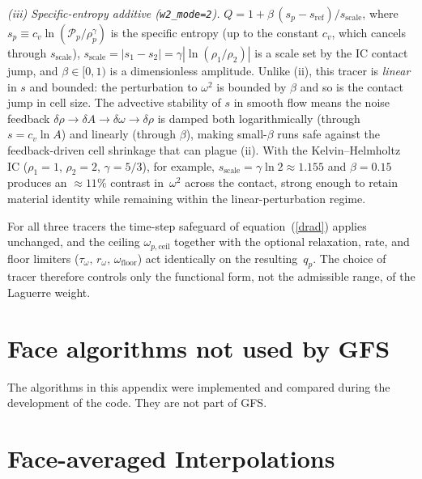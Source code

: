 \documentclass[twocolumn]{aastex63}
\newcommand{\pressure}[0]{\mathcal{P}}
\begin{document}
\textit{(iii) Specific-entropy additive (\texttt{w2\_mode=2}).}
$Q = 1 + \beta\,(s_p - s_\textrm{ref})/s_\textrm{scale}$, where
$s_p\equiv c_v\ln(\pressure_p/\rho_p^{\gamma})$ is the specific entropy
(up to the constant $c_v$, which cancels through
$s_\textrm{scale}$),
$s_\textrm{scale}=|s_1-s_2|=\gamma|\ln(\rho_1/\rho_2)|$ is a scale set by
the IC contact jump, and $\beta\in[0,1)$ is a dimensionless amplitude.
Unlike (ii), this tracer is \emph{linear} in $s$ and bounded: the
perturbation to $\omega^2$ is bounded by $\beta$ and so is the contact
jump in cell size.  The advective stability of $s$ in smooth flow means
the noise feedback $\delta\rho\to\delta A\to\delta\omega\to\delta\rho$
is damped both logarithmically (through $s = c_v\ln A$) and linearly
(through $\beta$), making small-$\beta$ runs safe against the
feedback-driven cell shrinkage that can plague (ii).
With the Kelvin--Helmholtz IC ($\rho_1=1$, $\rho_2=2$, $\gamma=5/3$), for example,
$s_\textrm{scale}=\gamma\ln 2\approx 1.155$ and $\beta=0.15$ produces an
$\approx\!11\%$ contrast in~$\omega^2$ across the contact, strong enough
to retain material identity while remaining within the
linear-perturbation regime.

For all three tracers the time-step safeguard of equation~(\ref{drad})
applies unchanged, and the ceiling $\omega_{p,\textrm{ceil}}$ together
with the optional relaxation, rate, and floor limiters
($\tau_\omega,\,r_\omega,\,\omega_\textrm{floor}$) act identically on the
resulting~$q_p$.  The choice of tracer therefore controls only the
functional form, not the admissible range, of the Laguerre weight.


\section{Face algorithms not used by GFS}
The algorithms in this appendix were implemented and compared during the development of the code. They are not part of GFS.

\section{Face-averaged Interpolations}
\end{document}
